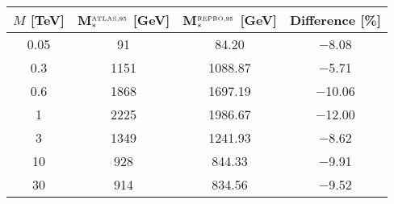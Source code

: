 \begin{flushleft}

\begin{table}[!htbp]
\centering
\begin{tabular}{c|c|c|c}
 \hline
 \hline
 $M$ [TeV] & M$_{*}^{\mbox{\tiny ATLAS,95}}$ [GeV] & M$_{*}^{\mbox{\tiny REPRO,95}}$ [GeV] & Difference [\%] \\ 
 \hline
 0.05 & 91 & 84.20 & $-$8.08 \\
0.3 & 1151 & 1088.87 & $-$5.71 \\
0.6 & 1868 & 1697.19 & $-$10.06 \\
1 & 2225 & 1986.67 & $-$12.00 \\
3 & 1349 & 1241.93 & $-$8.62 \\
10 & 928 & 844.33 & $-$9.91 \\
30 & 914 & 834.56 & $-$9.52\\


\end{tabular}
\end{table}
\end{flushleft}

